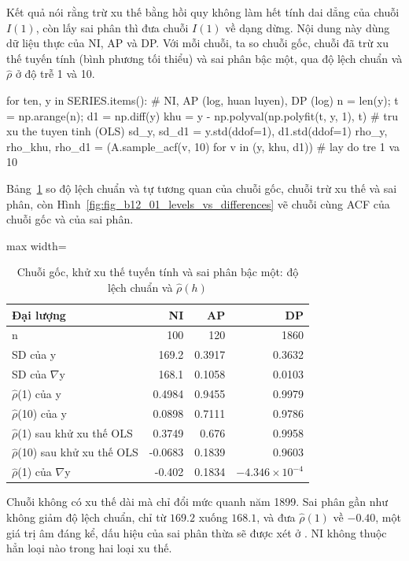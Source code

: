  Kết quả  nói rằng trừ xu thế bằng hồi quy không làm hết tính dai dẳng của chuỗi $I(1)$, còn lấy sai phân thì đưa chuỗi $I(1)$ về dạng dừng.
 Nội dung này dùng dữ liệu thực của NI, AP và DP. Với mỗi chuỗi, ta so chuỗi gốc, chuỗi đã trừ xu thế tuyến tính (bình phương tối thiểu) và sai phân bậc một, qua độ lệch chuẩn và $\hat\rho$ ở độ trễ 1 và 10.
\begin{codeblock}
for ten, y in SERIES.items():                      # NI, AP (log, huan luyen), DP (log)
    n = len(y); t = np.arange(n); d1 = np.diff(y)
    khu = y - np.polyval(np.polyfit(t, y, 1), t)             # tru xu the tuyen tinh (OLS)
    sd_y, sd_d1 = y.std(ddof=1), d1.std(ddof=1)
    rho_y, rho_khu, rho_d1 = (A.sample_acf(v, 10) for v in (y, khu, d1))   # lay do tre 1 va 10
\end{codeblock}
 Bảng~\ref{tab:tab_b12_01_levels_vs_differences} so độ lệch chuẩn và tự tương quan của chuỗi gốc, chuỗi trừ xu thế và sai phân, còn Hình~\ref{fig:fig_b12_01_levels_vs_differences} vẽ chuỗi cùng ACF của chuỗi gốc và của sai phân.
\begin{table}[H]
\centering\footnotesize
\caption{Chuỗi gốc, khử xu thế tuyến tính và sai phân bậc một: độ lệch chuẩn và $\hat\rho(h)$}\label{tab:tab_b12_01_levels_vs_differences}
\begin{adjustbox}{max width=\linewidth}
\begin{tabular}{|l|r|r|r|}
\toprule
Đại lượng & NI & AP & DP \\
\midrule
n & 100 & 120 & 1860 \\
SD của y & 169.2 & 0.3917 & 0.3632 \\
SD của $\nabla$y & 168.1 & 0.1058 & 0.0103 \\
$\hat{\rho}$(1) của y & 0.4984 & 0.9455 & 0.9979 \\
$\hat{\rho}$(10) của y & 0.0898 & 0.7111 & 0.9786 \\
$\hat{\rho}$(1) sau khử xu thế OLS & 0.3749 & 0.676 & 0.9958 \\
$\hat{\rho}$(10) sau khử xu thế OLS & -0.0683 & 0.1839 & 0.9603 \\
$\hat{\rho}$(1) của $\nabla$y & -0.402 & 0.1834 & $-4.346\times10^{-4}$ \\
\bottomrule
\end{tabular}
\end{adjustbox}
\end{table}
 Chuỗi không có xu thế dài mà chỉ đổi mức quanh năm 1899. Sai phân gần như không giảm độ lệch chuẩn, chỉ từ $169.2$ xuống $168.1$, và đưa $\hat\rho(1)$ về $-0.40$, một giá trị âm đáng kể, dấu hiệu của sai phân thừa sẽ được xét ở . NI không thuộc hẳn loại nào trong hai loại xu thế.


